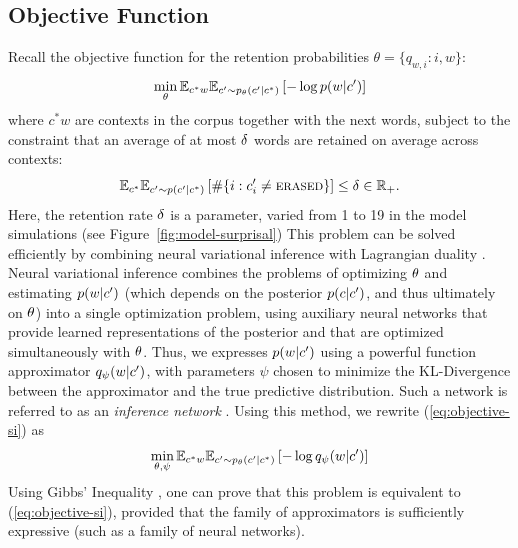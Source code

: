 \subsection{Objective Function}\label{sec:variational}
Recall the objective function for the retention probabilities $\theta = \{q_{w, i} : i,w\}$:
\begin{equation}\label{eq:objective-si}
	\min_\theta \mathbb{E}_{c^*w} \mathbb{E}_{c' \sim p_\theta(c'|c^*)} \left[- \log p(w|c')\right]
\end{equation}
where $c^* w$ are contexts in the corpus together with the next words,
subject to the constraint that an average of at most $\delta$ words are retained on average across contexts:
\begin{equation}\label{eq:objective-erasure-si}
	\mathbb{E}_{c^*} \mathbb{E}_{c' \sim p(c'|c^*)} \left[\#\{i : c'_i \neq \text{\textsc{erased}}\}\right] \leq \delta \in \mathbb{R}_+.
\end{equation}
Here, the retention rate $\delta$ is a parameter, varied from 1 to 19 in the model simulations (see Figure~\ref{fig:model-surprisal})
This problem can be solved efficiently by combining neural variational inference  \citep{mnih2014neural, kingma2014auto} with Lagrangian duality \citep{Boyd2006ConvexO}.
Neural variational inference 
combines the problems of optimizing $\theta$ and estimating $p(w|c')$ (which depends on the posterior $p(c|c')$, and thus ultimately on $\theta$) into a single optimization problem, using auxiliary neural networks that provide learned representations of the posterior and that are optimized simultaneously with $\theta$.
Thus, we expresses $p(w|c')$ using a powerful function approximator $q_\psi(w|c')$, with parameters $\psi$ chosen to minimize the KL-Divergence between the approximator and the true predictive distribution.
Such a network is referred to as an \textit{inference network} \citep{mnih2014neural, kingma2014auto}.
Using this method, we rewrite (\ref{eq:objective-si}) as
\begin{equation}\label{eq:objective-with-amortized}
	\min_{\theta, \psi} \mathbb{E}_{c^*w} \mathbb{E}_{c' \sim p_\theta(c'|c^*)} \left[- \log q_\psi(w|c')\right]
\end{equation}
Using Gibbs' Inequality \citep{Cover2005ElementsOI}, one can prove that this problem is equivalent to (\ref{eq:objective-si}), provided that the family of approximators is sufficiently expressive (such as a family of neural networks).
